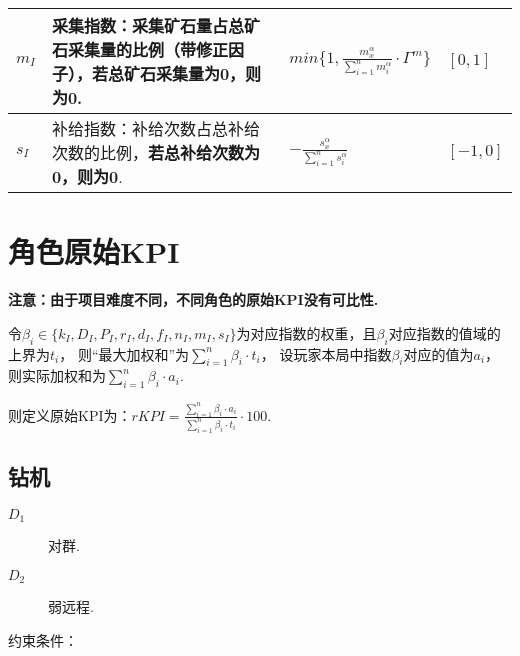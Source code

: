 \documentclass{ctexart}
\begin{document}
\begin{longtable}{|>{\centering\arraybackslash}p{4em}|>{\centering\arraybackslash}p{14em}|>{\centering\arraybackslash}p{10em}|>{\centering\arraybackslash}p{4em}|}
    \hline

    $m_I$        & 采集指数：采集矿石量占总矿石采集量的比例（带修正因子），\textbf{若总矿石采集量为0，则为0}. & $min\{1, \frac{m_x^\alpha}{\sum_{i = 1}^{n} m_i^\alpha} \cdot \Gamma^m\}$ & $[0, 1]$                \\

    \hline

    $s_I$        & 补给指数：补给次数占总补给次数的比例，\textbf{若总补给次数为0，则为0}.           & $-\frac{s_x^\alpha}{\sum_{i = 1}^{n} s_i^\alpha}$                         & $[-1, 0]$               \\

    \hline
\end{longtable}


\section{角色原始KPI}
\label{sec:rKPI}

\textbf{注意：由于项目难度不同，不同角色的原始KPI没有可比性.}

令$\beta_i \in \{k_I, D_I, P_I, r_I, d_I, f_I, n_I, m_I, s_I\}$为对应指数的权重，且$\beta_i$对应指数的值域的上界为$t_i$，
则“最大加权和”为$\sum_{i = 1}^{n} \beta_i \cdot t_i$，
设玩家本局中指数$\beta_i$对应的值为$a_i$，则实际加权和为$\sum_{i = 1}^{n} \beta_i \cdot a_i$.

则定义原始KPI为：$rKPI = \frac{\sum_{i = 1}^{n} \beta_i \cdot a_i}{\sum_{i = 1}^{n} \beta_i \cdot t_i} \cdot 100$.

\subsection{钻机}

\begin{description}
    \item[$D_1$] 对群\cite{tieba-all}.
    \item[$D_2$] 弱远程.
\end{description}

约束条件：
\end{document}
